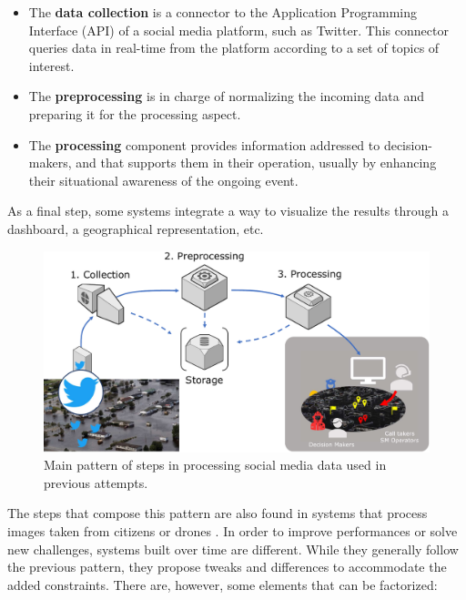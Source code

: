 \begin{itemize}
    \item The \textbf{data collection} is a connector to the Application Programming Interface (API) of a
          social media platform, such as Twitter.
          This connector queries data in real-time from the platform according to a set of topics of interest.
    \item The \textbf{preprocessing} is in charge of normalizing the incoming data and preparing it for the processing aspect.
    \item The \textbf{processing} component provides information addressed to decision-makers, and that supports them in their operation, usually by enhancing their situational awareness of the ongoing event.
\end{itemize}

As a final step, some systems integrate a way to visualize the results through a dashboard, a geographical representation, etc.

\begin{figure}[htb]
    \centering
    \includegraphics[width=\textwidth]{figures/chap-5/social-media-processing.pdf}
    \caption{Main pattern of steps in processing social media data used in previous attempts.}
    \label{system:sm-processing}
\end{figure}

The steps that compose this pattern are also found in systems that process images taken from citizens \parencite{alamImage4ActOnlineSocial2017} or drones \parencite{fanDisasterCityDigital2021}.
In order to improve performances or solve new challenges, systems built over time are different.
While they generally follow the previous pattern, they propose tweaks and differences to accommodate the added constraints.
There are, however, some elements that can be factorized:

